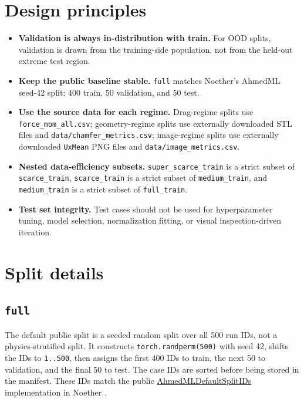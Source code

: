 \documentclass[10pt]{article}
\newcommand{\code}[1]{\texttt{#1}}
\newcommand{\splitkey}[1]{\texttt{#1}}
\begin{document}
\section*{Design principles}

\begin{itemize}
  \item \textbf{Validation is always in-distribution with train.} For OOD splits, validation is drawn from the training-side population, not from the held-out extreme test region.
  \item \textbf{Keep the public baseline stable.} \splitkey{full} matches Noether's AhmedML seed-42 split: 400 train, 50 validation, and 50 test.
  \item \textbf{Use the source data for each regime.} Drag-regime splits use \code{force\_mom\_all.csv}; geometry-regime splits use externally downloaded STL files and \code{data/chamfer\_metrics.csv}; image-regime splits use externally downloaded \code{UxMean} PNG files and \code{data/image\_metrics.csv}.
  \item \textbf{Nested data-efficiency subsets.} \splitkey{super\_scarce\_train} is a strict subset of \splitkey{scarce\_train}, \splitkey{scarce\_train} is a strict subset of \splitkey{medium\_train}, and \splitkey{medium\_train} is a strict subset of \splitkey{full\_train}.
  \item \textbf{Test set integrity.} Test cases should not be used for hyperparameter tuning, model selection, normalization fitting, or visual inspection-driven iteration.
\end{itemize}

\section*{Split details}

\subsection*{\splitkey{full}}

The default public split is a seeded random split over all 500 run IDs, not a
physics-stratified split. It constructs \code{torch.randperm(500)} with seed
42, shifts the IDs to \code{1..500}, then assigns the first 400 IDs to train,
the next 50 to validation, and the final 50 to test. The case IDs are sorted
before being stored in the manifest. These IDs match the public
\href{https://github.com/Emmi-AI/noether/blob/main/src/noether/data/datasets/cfd/caeml/ahmedml/split.py}{AhmedMLDefaultSplitIDs}
implementation in Noether \cite{noether_split}.
\end{document}
